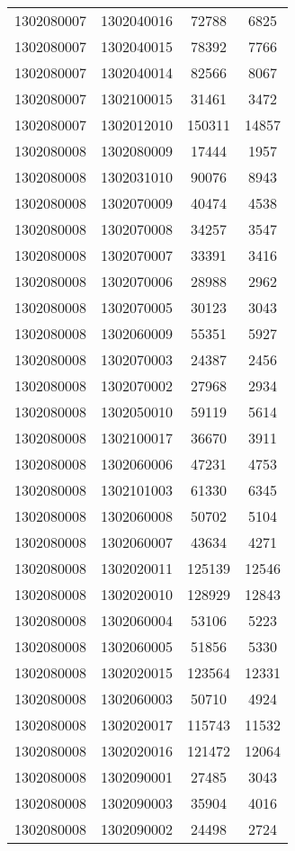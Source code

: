 \begin{longtable}{llcc}
1302080007 & 1302040016 & 72788 & 6825\\
1302080007 & 1302040015 & 78392 & 7766\\
1302080007 & 1302040014 & 82566 & 8067\\
1302080007 & 1302100015 & 31461 & 3472\\
1302080007 & 1302012010 & 150311 & 14857\\
1302080008 & 1302080009 & 17444 & 1957\\
1302080008 & 1302031010 & 90076 & 8943\\
1302080008 & 1302070009 & 40474 & 4538\\
1302080008 & 1302070008 & 34257 & 3547\\
1302080008 & 1302070007 & 33391 & 3416\\
1302080008 & 1302070006 & 28988 & 2962\\
1302080008 & 1302070005 & 30123 & 3043\\
1302080008 & 1302060009 & 55351 & 5927\\
1302080008 & 1302070003 & 24387 & 2456\\
1302080008 & 1302070002 & 27968 & 2934\\
1302080008 & 1302050010 & 59119 & 5614\\
1302080008 & 1302100017 & 36670 & 3911\\
1302080008 & 1302060006 & 47231 & 4753\\
1302080008 & 1302101003 & 61330 & 6345\\
1302080008 & 1302060008 & 50702 & 5104\\
1302080008 & 1302060007 & 43634 & 4271\\
1302080008 & 1302020011 & 125139 & 12546\\
1302080008 & 1302020010 & 128929 & 12843\\
1302080008 & 1302060004 & 53106 & 5223\\
1302080008 & 1302060005 & 51856 & 5330\\
1302080008 & 1302020015 & 123564 & 12331\\
1302080008 & 1302060003 & 50710 & 4924\\
1302080008 & 1302020017 & 115743 & 11532\\
1302080008 & 1302020016 & 121472 & 12064\\
1302080008 & 1302090001 & 27485 & 3043\\
1302080008 & 1302090003 & 35904 & 4016\\
1302080008 & 1302090002 & 24498 & 2724\\

\end{longtable}
